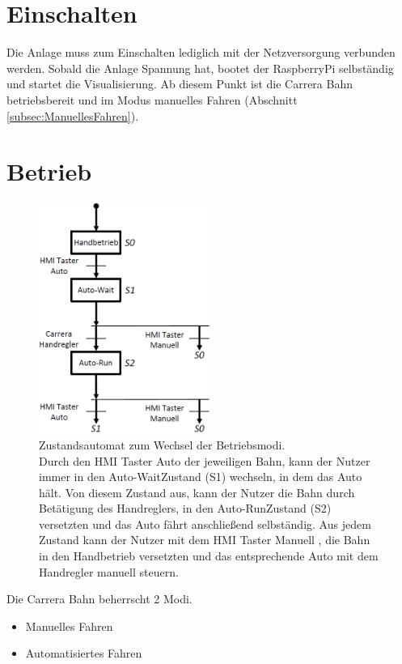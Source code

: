 \documentclass[a4paper, 11pt]{report}
\begin{document}
\section{Einschalten}
	Die Anlage muss zum Einschalten lediglich mit der Netzversorgung verbunden werden. Sobald die Anlage Spannung hat, bootet der RaspberryPi selbständig und startet die Visualisierung. Ab diesem Punkt ist die Carrera Bahn betriebsbereit und im Modus manuelles Fahren (Abschnitt \ref{subsec:ManuellesFahren}).
\section{Betrieb}
	\begin{figure}[ht]
		\centering
		\includegraphics[width=0.5\textwidth]{rec/modiAuswahl.png}
		\caption[Zustandsautomat zum Wechsel der Betriebsmodi]{Zustandsautomat zum Wechsel der Betriebsmodi.\\Durch den \glqq HMI Taster Auto \grqq der jeweiligen Bahn, kann der Nutzer immer in den \glqq Auto-Wait\grqq Zustand (S1) wechseln, in dem das Auto hält. Von diesem Zustand aus, kann der Nutzer die Bahn durch Betätigung des Handreglers, in den \glqq Auto-Run\grqq Zustand (S2) versetzten und das Auto fährt anschließend selbständig. Aus jedem Zustand kann der Nutzer mit dem \glqq HMI Taster Manuell \grqq, die Bahn in den Handbetrieb versetzten und das entsprechende Auto mit dem Handregler manuell steuern.}
		\label{img:Betriebsmodi}
	\end{figure}
	Die Carrera Bahn beherrscht 2 Modi.
	\begin{itemize}
		\item Manuelles Fahren
		\item Automatisiertes Fahren
	\end{itemize}
\end{document}
